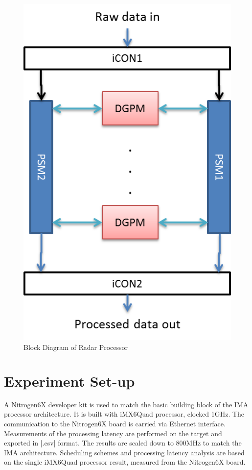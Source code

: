 \begin{figure}[h!]
	\centering
	\includegraphics[]{figures/radar_processor}
	\caption{Block Diagram of Radar Processor \cite{fcas}}
	\label{fig:bg_related_work:ima:radar_processor}
\end{figure}

\section{Experiment Set-up}
\label{s:bg_related_work:exp_setup}
A Nitrogen6X developer kit is used to match the basic building block of the IMA processor architecture. It is built with iMX6Quad processor, clocked 1GHz. The communication to the Nitrogen6X board is carried via Ethernet interface. Measurements of the processing latency are performed on the target and exported in \bverb|.csv| format. The results are scaled down to 800MHz to match the IMA architecture. Scheduling schemes and processing latency analysis are based on the single iMX6Quad processor result, measured from the Nitrogen6X board.


